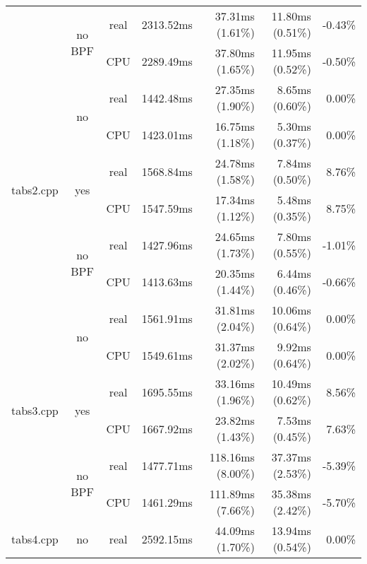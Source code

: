 \documentclass[en]{pracamgr}
\begin{document}
\begin{appendices}
\begin{small}
\begin{longtable}{|l|c|c|r|r|r|r|}
                            \cline{2-7}
                            & \multirow{2}{*}{no BPF} & real & 2313.52ms & 37.31ms (1.61\%) & 11.80ms (0.51\%) & -0.43\% \\*
                            &                         & CPU  & 2289.49ms & 37.80ms (1.65\%) & 11.95ms (0.52\%) & -0.50\% \\
\hline
\multirow{6}{*}{tabs2.cpp}  & \multirow{2}{*}{no}     & real & 1442.48ms & 27.35ms (1.90\%) & 8.65ms (0.60\%) & 0.00\% \\*
                            &                         & CPU  & 1423.01ms & 16.75ms (1.18\%) & 5.30ms (0.37\%) & 0.00\% \\*
                            \cline{2-7}
                            & \multirow{2}{*}{yes}    & real & 1568.84ms & 24.78ms (1.58\%) & 7.84ms (0.50\%) & 8.76\% \\*
                            &                         & CPU  & 1547.59ms & 17.34ms (1.12\%) & 5.48ms (0.35\%) & 8.75\% \\*
                            \cline{2-7}
                            & \multirow{2}{*}{no BPF} & real & 1427.96ms & 24.65ms (1.73\%) & 7.80ms (0.55\%) & -1.01\% \\*
                            &                         & CPU  & 1413.63ms & 20.35ms (1.44\%) & 6.44ms (0.46\%) & -0.66\% \\
\hline
\multirow{6}{*}{tabs3.cpp}  & \multirow{2}{*}{no}     & real & 1561.91ms & 31.81ms (2.04\%) & 10.06ms (0.64\%) & 0.00\% \\*
                            &                         & CPU  & 1549.61ms & 31.37ms (2.02\%) & 9.92ms (0.64\%) & 0.00\% \\*
                            \cline{2-7}
                            & \multirow{2}{*}{yes}    & real & 1695.55ms & 33.16ms (1.96\%) & 10.49ms (0.62\%) & 8.56\% \\*
                            &                         & CPU  & 1667.92ms & 23.82ms (1.43\%) & 7.53ms (0.45\%) & 7.63\% \\*
                            \cline{2-7}
                            & \multirow{2}{*}{no BPF} & real & 1477.71ms & 118.16ms (8.00\%) & 37.37ms (2.53\%) & -5.39\% \\*
                            &                         & CPU  & 1461.29ms & 111.89ms (7.66\%) & 35.38ms (2.42\%) & -5.70\% \\
\hline
\multirow{6}{*}{tabs4.cpp}  & \multirow{2}{*}{no}     & real & 2592.15ms & 44.09ms (1.70\%) & 13.94ms (0.54\%) & 0.00\% \\*

\end{longtable}
\end{small}
\end{appendices}
\end{document}
